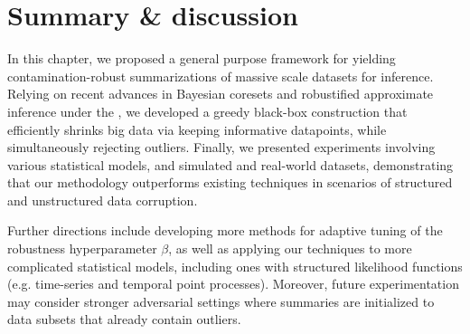 \section{Summary \& discussion}%
\label{sec:conclusion}
In this chapter, we proposed a general purpose framework for yielding  contamination-robust summarizations of massive scale datasets for inference. Relying on recent advances in Bayesian coresets and robustified approximate inference under the \bdiv{}, we developed a greedy black-box construction that efficiently shrinks big data via keeping informative datapoints, while simultaneously rejecting outliers.
Finally, we presented experiments involving various statistical models, and simulated and real-world datasets, demonstrating that our methodology outperforms existing techniques in scenarios of structured and unstructured data corruption. 

Further directions include developing more methods for adaptive tuning of the robustness hyperparameter $\beta$, as well as applying our techniques to more complicated statistical models, including ones with structured likelihood functions (e.g. time-series and temporal point processes). Moreover, future experimentation may consider stronger adversarial settings where summaries are initialized to data subsets that already contain outliers. 
